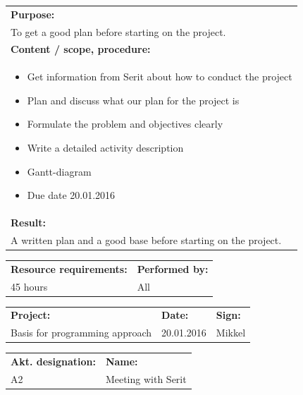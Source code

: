 \documentclass[12pt, a4paper]{article}
\begin{document}
\begin{tabularx}{\textwidth}{|X|}
	\textbf{Purpose:}\\
	To get a good plan before starting on the project.\\
	\hline
	\textbf{Content / scope, procedure:}\\
	\begin{itemize}[noitemsep,topsep=0pt]
		\item Get information from Serit about how to conduct the project
		\item Plan and discuss what our plan for the project is
		\item Formulate the problem and objectives clearly
		\item Write a detailed activity description
		\item Gantt-diagram
		\item Due date 20.01.2016


	\end{itemize}\\
 	\hline
	\textbf{Result:}\\
	A written plan and a good base before starting on the project.\\
	\hline
\end{tabularx}

\begin{tabularx}{\textwidth}{|X|p{30mm}|}
	\textbf{Resource requirements:}&\textbf{Performed by:}\\
	45 hours&All\\
	\hline
\end{tabularx}

\newpage

\begin{tabularx}{\textwidth}{|X|p{32mm}|p{20mm}|}
	\hline
	\textbf{Project:}&\textbf{Date:}&\textbf{Sign:}\\
	Basis for programming approach&20.01.2016&Mikkel\\
	\hline
\end{tabularx}

\begin{tabularx}{\textwidth}{|p{40mm}|X|}
	\textbf{Akt. designation:}&\textbf{Name:}\\
	A2&Meeting with Serit\\
	\hline
\end{tabularx}
\end{document}
